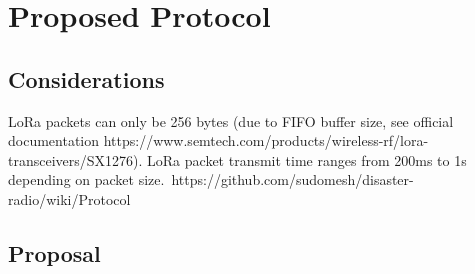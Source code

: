 \chapter{Proposed Protocol}
\section{Considerations}
LoRa packets can only be 256 bytes (due to FIFO buffer size, see official documentation https://www.semtech.com/products/wireless-rf/lora-transceivers/SX1276).
LoRa packet transmit time ranges from 200ms to 1s depending on packet size.\
https://github.com/sudomesh/disaster-radio/wiki/Protocol
\section{Proposal}
%


